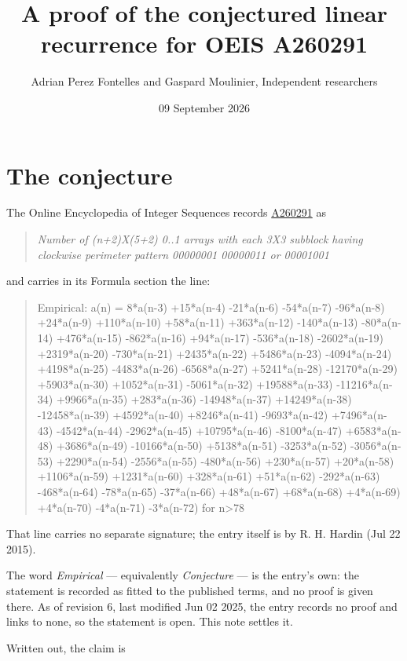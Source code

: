 \documentclass[11pt]{article}
\title{A proof of the conjectured linear recurrence for OEIS A260291}
\author{Adrian Perez Fontelles and Gaspard Moulinier, Independent researchers}
\date{09 September 2026}
\theoremstyle{definition}
\begin{document}
\maketitle
\section{The conjecture}

The Online Encyclopedia of Integer Sequences records \href{https://oeis.org/A260291}{A260291} as

\begin{quote}\itshape Number of (n+2)X(5+2) 0..1 arrays with each 3X3 subblock having clockwise perimeter pattern 00000001 00000011 or 00001001\end{quote}

and carries in its Formula section the line:

\begin{quote}\ttfamily Empirical: a(n) = 8*a(n-3) +15*a(n-4) -21*a(n-6) -54*a(n-7) -96*a(n-8) +24*a(n-9) +110*a(n-10) +58*a(n-11) +363*a(n-12) -140*a(n-13) -80*a(n-14) +476*a(n-15) -862*a(n-16) +94*a(n-17) -536*a(n-18) -2602*a(n-19) +2319*a(n-20) -730*a(n-21) +2435*a(n-22) +5486*a(n-23) -4094*a(n-24) +4198*a(n-25) -4483*a(n-26) -6568*a(n-27) +5241*a(n-28) -12170*a(n-29) +5903*a(n-30) +1052*a(n-31) -5061*a(n-32) +19588*a(n-33) -11216*a(n-34) +9966*a(n-35) +283*a(n-36) -14948*a(n-37) +14249*a(n-38) -12458*a(n-39) +4592*a(n-40) +8246*a(n-41) -9693*a(n-42) +7496*a(n-43) -4542*a(n-44) -2962*a(n-45) +10795*a(n-46) -8100*a(n-47) +6583*a(n-48) +3686*a(n-49) -10166*a(n-50) +5138*a(n-51) -3253*a(n-52) -3056*a(n-53) +2290*a(n-54) -2556*a(n-55) -480*a(n-56) +230*a(n-57) +20*a(n-58) +1106*a(n-59) +1231*a(n-60) +328*a(n-61) +51*a(n-62) -292*a(n-63) -468*a(n-64) -78*a(n-65) -37*a(n-66) +48*a(n-67) +68*a(n-68) +4*a(n-69) +4*a(n-70) -4*a(n-71) -3*a(n-72) for n>78\end{quote}

That line carries no separate signature; the entry itself is by R. H. Hardin (Jul 22 2015).

The word {\itshape Empirical} --- equivalently {\itshape Conjecture} --- is the entry's own: the statement is recorded as fitted to the published terms, and no proof is given there. As of revision 6, last modified Jun 02 2025, the entry records no proof and links to none, so the statement is open. This note settles it.

Written out, the claim is
\end{document}
